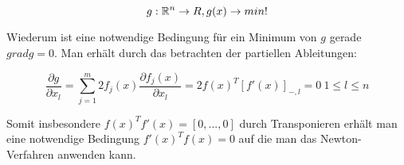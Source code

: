 \documentclass{report}
\begin{document}
\begin{equation}
    g: \RR^n \to R, g(x) \to min!
\end{equation}

Wiederum ist eine notwendige Bedingung für ein Minimum von $g$ gerade $grad g = 0$. Man erhält durch das betrachten der partiellen Ableitungen:

\begin{equation}
    \frac{\partial g}{\partial x_l}= \sum_{j=1}^m 2f_j(x) \frac{\partial f_j(x)}{\partial x_l}= 2f(x)^T[f'(x)]_{-,l} = 0 ~ 1 \leq l \leq n
\end{equation}

Somit insbesondere $f(x)^Tf'(x) = [0,...,0]$ durch Transponieren erhält man eine notwendige Bedingung  $f'(x)^Tf(x)= 0$ auf die man das Newton-Verfahren anwenden kann.
\end{document}
